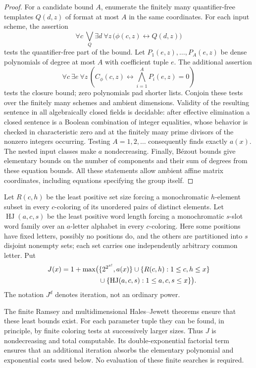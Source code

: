 \begin{proof}
For a candidate bound $A$, enumerate the finitely many quantifier-free
templates $Q(d,z)$ of format at most $A$ in the same coordinates.  For each
input scheme, the assertion
\[
 \forall c\ \bigvee_Q\exists d\ \forall z\,
       \bigl(\phi(c,z)\longleftrightarrow Q(d,z)\bigr)
\]
tests the quantifier-free part of the bound.  Let $P_1(e,z),\ldots,P_A(e,z)$
be dense polynomials of degree at most $A$ with coefficient tuple $e$.
The additional assertion
\[
 \forall c\ \exists e\ \forall z\,
 \left(C_\phi(c,z)\longleftrightarrow
                       \bigwedge_{i=1}^{A}P_i(e,z)=0\right)
\]
tests the closure bound; zero polynomials pad shorter lists.  Conjoin these
tests over the finitely many schemes and ambient dimensions.  Validity of
the resulting sentence in all algebraically closed fields is decidable:
after effective elimination a closed sentence is a Boolean combination of
integer equalities, whose behavior is checked in characteristic zero and at
the finitely many prime divisors of the nonzero integers occurring.  Testing
$A=1,2,\ldots$ consequently finds exactly $a(x)$.  The nested input classes
make $a$ nondecreasing.  Finally, B\'ezout bounds give elementary bounds on
the number of components and their sum of degrees from these equation
bounds.  All these statements allow ambient affine matrix coordinates,
including equations specifying the group itself.
\end{proof}

\begin{definition}\label{q:J}
Let $R(c,h)$ be the least positive set size forcing a monochromatic
$h$-element subset in every $c$-coloring of its unordered pairs of distinct
elements.  Let $\operatorname{HJ}(a,c,s)$ be the least positive word length
forcing a monochromatic $s$-slot word family over an $a$-letter alphabet in
every $c$-coloring.  Here some positions have fixed letters, possibly no
positions do, and the others are partitioned into $s$ disjoint nonempty
sets; each set carries one independently arbitrary common letter.  Put
\begin{align}
 J(x)=1+\max\bigl(&\{2^{2^{x!}},a(x)\}
     \cup\{R(c,h):1\le c,h\le x\}\notag\\
     &\cup\{\operatorname{HJ}(a,c,s):1\le a,c,s\le x\}\bigr).
 \label{q:J-formula}
\end{align}
The notation $J^d$ denotes iteration, not an ordinary power.
\end{definition}

The finite Ramsey and multidimensional Hales--Jewett theorems
\cite{Ramsey1930,HalesJewett1963} ensure that these least bounds exist.
For each parameter tuple they can be found, in principle, by finite coloring
tests at successively larger sizes.  Thus $J$ is nondecreasing and total
computable.  Its double-exponential factorial term ensures that an additional
iteration absorbs the elementary polynomial and exponential costs used below.
No evaluation of these finite searches is required.

